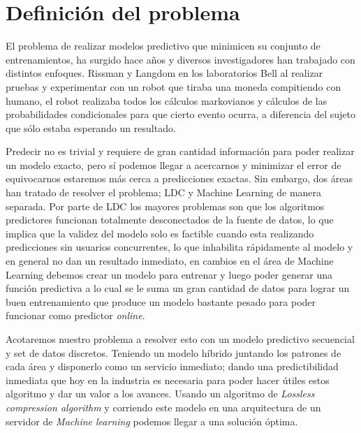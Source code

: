 

\section{Definición del problema}


El problema de realizar modelos predictivo que minimicen su conjunto de entrenamientos, ha surgido hace años y diversos investigadores han trabajado con distintos enfoques. Rissman \cite{Rissanen1983} y Langdom \cite{Langdon1983} en los laboratorios {Bell} al realizar pruebas y experimentar con un robot que tiraba una moneda compitiendo con humano, el robot realizaba todos los cálculos {markovianos} y cálculos de las probabilidades condicionales para que cierto evento ocurra, a diferencia del sujeto que sólo estaba esperando un resultado.

Predecir no es trivial y requiere de gran cantidad información para poder realizar un modelo exacto, pero sí podemos llegar a acercarnos y minimizar el error de equivocarnos estaremos más cerca a predicciones exactas. Sin embargo, dos áreas han tratado de resolver el problema; {LDC} y {Machine Learning} de manera separada. Por parte de {LDC} los mayores problemas son que los algoritmos predictores funcionan totalmente desconectados de la fuente de datos, lo que implica que la validez del modelo solo es factible cuando esta realizando predicciones sin usuarios concurrentes, lo que inhabilita rápidamente al modelo y en general no dan un resultado inmediato, en cambios en el área de Machine Learning debemos crear un modelo para entrenar y luego poder generar una función predictiva a lo cual se le suma un gran cantidad de datos para lograr un buen entrenamiento que produce un modelo bastante pesado para poder funcionar como predictor \emph{online}. 

Acotaremos nuestro problema a resolver esto con un modelo predictivo secuencial y set de datos discretos. Teniendo un modelo híbrido juntando los patrones de cada área y disponerlo como un servicio inmediato; dando una predictibilidad inmediata que hoy en la industria es necesaria para poder hacer útiles estos algoritmo y dar un valor a los avances. Usando un algoritmo de \emph{Lossless compression algorithm} y corriendo este modelo en una arquitectura de un servidor de \emph{Machine learning} podemos llegar a una solución óptima.


